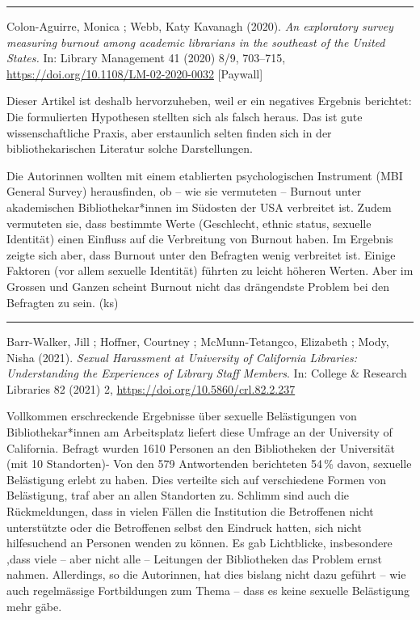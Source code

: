 \documentclass[a4paper,
fontsize=11pt,
oneside,
numbers=noperiodatend,
parskip=half-,
bibliography=totoc,
final
]{scrartcl}
\begin{document}
\begin{center}\rule{0.5\linewidth}{0.5pt}\end{center}

Colon-Aguirre, Monica ; Webb, Katy Kavanagh (2020). \emph{An exploratory
survey measuring burnout among academic librarians in the southeast of
the United States.} In: Library Management 41 (2020) 8/9, 703--715,
\url{https://doi.org/10.1108/LM-02-2020-0032} {[}Paywall{]}

Dieser Artikel ist deshalb hervorzuheben, weil er ein negatives Ergebnis
berichtet: Die formulierten Hypothesen stellten sich als falsch heraus.
Das ist gute wissenschaftliche Praxis, aber erstaunlich selten finden
sich in der bibliothekarischen Literatur solche Darstellungen.

Die Autorinnen wollten mit einem etablierten psychologischen Instrument
(MBI General Survey) herausfinden, ob -- wie sie vermuteten -- Burnout
unter akademischen Bibliothekar*innen im Südosten der USA verbreitet
ist. Zudem vermuteten sie, dass bestimmte Werte (Geschlecht, ethnic
status, sexuelle Identität) einen Einfluss auf die Verbreitung von
Burnout haben. Im Ergebnis zeigte sich aber, dass Burnout unter den
Befragten wenig verbreitet ist. Einige Faktoren (vor allem sexuelle
Identität) führten zu leicht höheren Werten. Aber im Grossen und Ganzen
scheint Burnout nicht das drängendste Problem bei den Befragten zu sein.
(ks)

\begin{center}\rule{0.5\linewidth}{0.5pt}\end{center}

Barr-Walker, Jill ; Hoffner, Courtney ; McMunn-Tetangco, Elizabeth ;
Mody, Nisha (2021). \emph{Sexual Harassment at University of California
Libraries: Understanding the Experiences of Library Staff Members}. In:
College \& Research Libraries 82 (2021) 2,
\url{https://doi.org/10.5860/crl.82.2.237}

Vollkommen erschreckende Ergebnisse über sexuelle Belästigungen von
Bibliothekar*innen am Arbeitsplatz liefert diese Umfrage an der
University of California. Befragt wurden 1610 Personen an den
Bibliotheken der Universität (mit 10 Standorten)- Von den 579
Antwortenden berichteten 54\,\% davon, sexuelle Belästigung erlebt zu
haben. Dies verteilte sich auf verschiedene Formen von Belästigung, traf
aber an allen Standorten zu. Schlimm sind auch die Rückmeldungen, dass
in vielen Fällen die Institution die Betroffenen nicht unterstützte oder
die Betroffenen selbst den Eindruck hatten, sich nicht hilfesuchend an
Personen wenden zu können. Es gab Lichtblicke, insbesondere ,dass viele
-- aber nicht alle -- Leitungen der Bibliotheken das Problem ernst
nahmen. Allerdings, so die Autorinnen, hat dies bislang nicht dazu
geführt -- wie auch regelmässige Fortbildungen zum Thema -- dass es
keine sexuelle Belästigung mehr gäbe.
\end{document}
